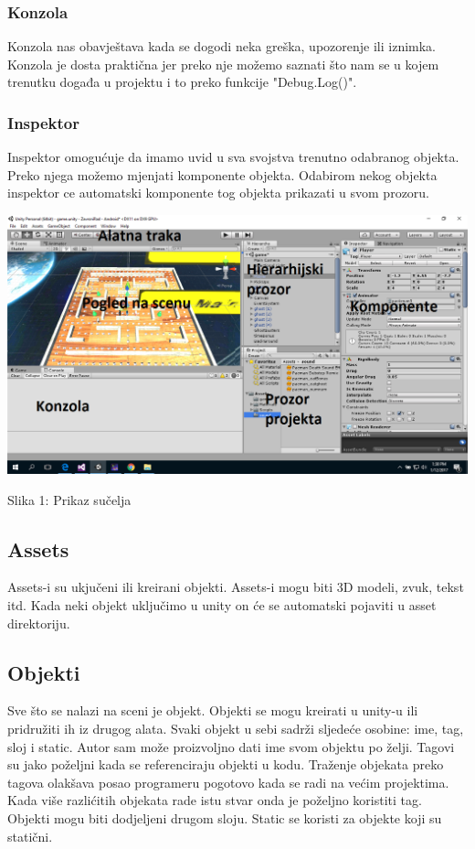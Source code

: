 \subsubsection{Konzola}
Konzola nas obavještava kada se dogodi neka greška, upozorenje ili iznimka. Konzola je dosta praktična jer  preko nje možemo saznati što nam se u kojem trenutku događa u projektu i to preko funkcije "Debug.Log()". 

\subsubsection{Inspektor}
Inspektor omogućuje da imamo uvid u sva svojstva trenutno odabranog objekta. Preko njega možemo mjenjati komponente objekta. Odabirom nekog objekta inspektor ce automatski komponente tog objekta prikazati u svom prozoru.




\begin{center}
\includegraphics[scale=0.35]{interface.png}

Slika 1: Prikaz sučelja
\end{center}

\subsection{Assets}
Assets-i su ukjučeni ili kreirani objekti. Assets-i mogu biti 3D modeli, zvuk, tekst itd. Kada neki objekt uključimo u unity on će se automatski pojaviti u asset direktoriju.


\subsection{Objekti}
Sve što se nalazi na sceni je objekt. Objekti se mogu kreirati u unity-u ili pridružiti ih iz drugog alata. Svaki objekt u sebi sadrži sljedeće osobine: ime, tag, sloj i static. Autor sam može proizvoljno dati ime svom objektu po želji. Tagovi su jako poželjni kada se referenciraju objekti u kodu. Traženje objekata preko tagova olakšava posao programeru pogotovo kada se radi na većim projektima. Kada više razlićitih objekata rade istu stvar onda je poželjno koristiti tag. Objekti mogu biti dodjeljeni drugom sloju. Static se koristi za objekte koji su statični.


